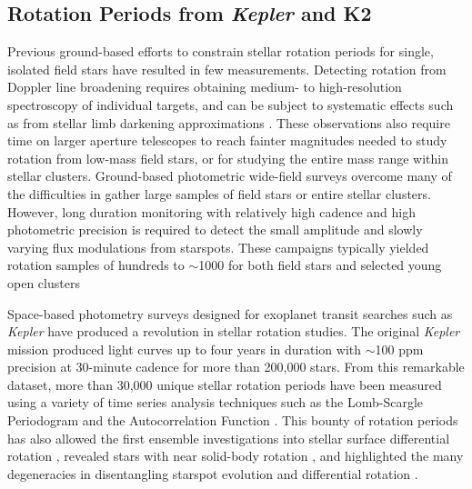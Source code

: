 \documentclass[12pt]{article}
\newcommand{\Kepler}{\textsl{Kepler}\xspace}
\begin{document}
\subsection{Rotation Periods from \Kepler and K2}
Previous ground-based efforts to constrain stellar rotation periods for single, isolated field stars have resulted in few measurements. Detecting rotation from Doppler line broadening requires obtaining medium- to high-resolution spectroscopy of individual targets, and can be subject to systematic effects such as from stellar limb darkening approximations \citep{collins1995}. These observations also require time on larger aperture telescopes to reach fainter magnitudes needed to study rotation from low-mass field stars, or for studying the entire mass range within stellar clusters. Ground-based photometric wide-field surveys overcome many of the difficulties in gather large samples of field stars or entire stellar clusters. However, long duration monitoring with relatively high cadence and high photometric precision is required to detect the small amplitude and slowly varying flux modulations from starspots. These campaigns typically yielded rotation samples of hundreds to $\sim$1000 for both field stars \citep[e.g.][]{hartman2011} and selected young open clusters \citep[e.g.][]{agueros2011,douglas2014,covey2016}


Space-based photometry surveys designed for exoplanet transit searches such as \Kepler \citep{borucki2010} have produced a revolution in stellar rotation studies. The original \Kepler mission produced light curves up to four years in duration with $\sim$100 ppm precision at 30-minute cadence for more than 200,000 stars. From this remarkable dataset, more than 30,000 unique stellar rotation periods have been measured using a variety of time series analysis techniques such as the Lomb-Scargle Periodogram \citep{reinhold2013} and the Autocorrelation Function \citep[][]{mcquillan2014}.
This bounty of rotation periods has also allowed the first ensemble investigations into stellar surface differential rotation \citep[e.g.][]{reinhold2013}, revealed stars with near solid-body rotation \citep{davenport2015a}, and highlighted the many degeneracies in disentangling starspot evolution and differential rotation \citep{aigrain2015}.
\end{document}
